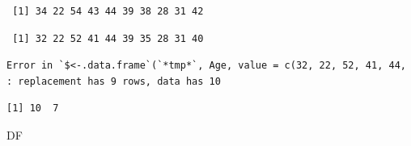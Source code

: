 \documentclass[11pt,a4paper]{book}
\newenvironment{Shaded}{\begin{snugshade}}{\end{snugshade}}
\newcommand{\KeywordTok}[1]{\textcolor[rgb]{0.13,0.29,0.53}{\textbf{#1}}}
\newcommand{\DecValTok}[1]{\textcolor[rgb]{0.00,0.00,0.81}{#1}}
\newcommand{\StringTok}[1]{\textcolor[rgb]{0.31,0.60,0.02}{#1}}
\newcommand{\CommentTok}[1]{\textcolor[rgb]{0.56,0.35,0.01}{\textit{#1}}}
\newcommand{\OperatorTok}[1]{\textcolor[rgb]{0.81,0.36,0.00}{\textbf{#1}}}
\newcommand{\NormalTok}[1]{#1}
\theoremstyle{definition}
\theoremstyle{definition}
\theoremstyle{definition}
\theoremstyle{remark}
\begin{document}
\begin{verbatim}
 [1] 34 22 54 43 44 39 38 28 31 42
\end{verbatim}

\begin{Shaded}
\end{Shaded}

\begin{verbatim}
 [1] 32 22 52 41 44 39 35 28 31 40
\end{verbatim}

\begin{Shaded}
\end{Shaded}

\begin{verbatim}
Error in `$<-.data.frame`(`*tmp*`, Age, value = c(32, 22, 52, 41, 44, : replacement has 9 rows, data has 10
\end{verbatim}

\begin{Shaded}
\end{Shaded}

\begin{verbatim}
[1] 10  7
\end{verbatim}

\begin{Shaded}
\begin{Highlighting}[]
\NormalTok{DF}
\end{Highlighting}
\end{Shaded}
\end{document}
